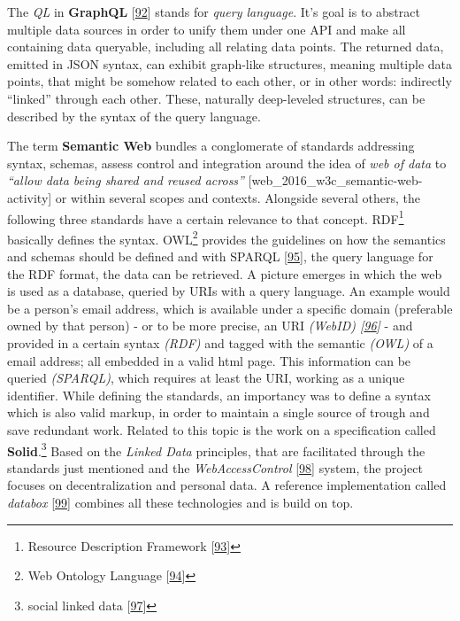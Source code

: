 \documentclass[12pt,english,a4paper,titlepage,cleardoublepage=empty,dottedtoc]{report}
\begin{document}
The \emph{QL} in \textbf{GraphQL}
{[}\protect\hyperlink{ref-web_spec_graphql}{92}{]} stands for
\emph{query language}. It's goal is to abstract multiple data sources in
order to unify them under one API and make all containing data
queryable, including all relating data points. The returned data,
emitted in JSON syntax, can exhibit graph-like structures, meaning
multiple data points, that might be somehow related to each other, or in
other words: indirectly ``linked'' through each other. These, naturally
deep-leveled structures, can be described by the syntax of the query
language.

The term \textbf{Semantic Web} bundles a conglomerate of standards
addressing syntax, schemas, assess control and integration around the
idea of \emph{web of data} to \emph{``allow data being shared and reused
across''} {[}web\_2016\_w3c\_semantic-web-activity{]} or within several
scopes and contexts. Alongside several others, the following three
standards have a certain relevance to that concept. RDF\footnote{Resource
  Description Framework {[}\protect\hyperlink{ref-web_w3c-tr_rdf}{93}{]}}
basically defines the syntax. OWL\footnote{Web Ontology Language
  {[}\protect\hyperlink{ref-web_w3c-tr_owl}{94}{]}} provides the
guidelines on how the semantics and schemas should be defined and with
SPARQL {[}\protect\hyperlink{ref-web_w3c-tr_sparql}{95}{]}, the query
language for the RDF format, the data can be retrieved. A picture
emerges in which the web is used as a database, queried by URIs with a
query language. An example would be a person's email address, which is
available under a specific domain (preferable owned by that person) - or
to be more precise, an URI \emph{(WebID)
{[}\protect\hyperlink{ref-web_w3c-draft_webid}{96}{]}} - and provided in
a certain syntax \emph{(RDF)} and tagged with the semantic \emph{(OWL)}
of a email address; all embedded in a valid html page. This information
can be queried \emph{(SPARQL)}, which requires at least the URI, working
as a unique identifier. While defining the standards, an importancy was
to define a syntax which is also valid markup, in order to maintain a
single source of trough and save redundant work. Related to this topic
is the work on a specification called \textbf{Solid}.\footnote{social
  linked data {[}\protect\hyperlink{ref-web_spec_solid}{97}{]}} Based on
the \emph{Linked Data} principles, that are facilitated through the
standards just mentioned and the \emph{WebAccessControl}
{[}\protect\hyperlink{ref-web_2016_wiki_webaccesscontrol}{98}{]} system,
the project focuses on decentralization and personal data. A reference
implementation called \emph{databox}
{[}\protect\hyperlink{ref-web_2016_demo_databox}{99}{]} combines all
these technologies and is build on top.
\end{document}
